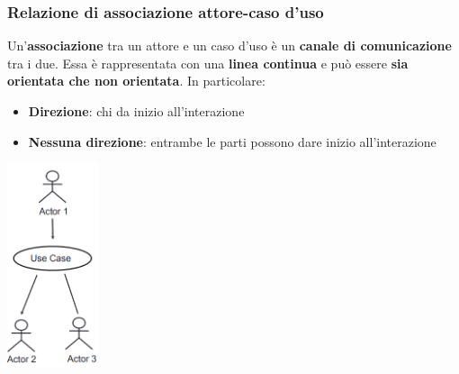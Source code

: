 \documentclass[12pt]{article}
\begin{document}
\subsubsection{Relazione di associazione attore-caso d'uso}
Un'\textbf{associazione} tra un attore e un caso d'uso è un \textbf{canale di comunicazione} tra i due.
Essa è rappresentata con una \textbf{linea continua} e può essere \textbf{sia orientata che non orientata}.
In particolare:
\begin{itemize}
    \item \textbf{Direzione}: chi da inizio all'interazione
    \item \textbf{Nessuna direzione}: entrambe le parti possono dare inizio all'interazione
\end{itemize}
\begin{center}
    \includegraphics[width = 0.20\textwidth]{Images/41.png}
\end{center}
\end{document}
